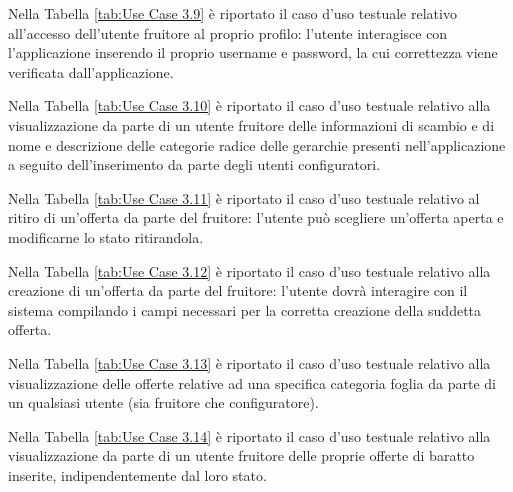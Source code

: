 Nella Tabella \ref{tab:Use Case 3.9} è riportato il caso d'uso testuale relativo all'accesso dell'utente fruitore al proprio profilo: l'utente interagisce con l'applicazione inserendo il proprio username e password, la cui correttezza viene verificata dall'applicazione.\bigskip

Nella Tabella \ref{tab:Use Case 3.10} è riportato il caso d'uso testuale relativo alla visualizzazione da parte di un utente fruitore delle informazioni di scambio e di nome e descrizione delle categorie radice delle gerarchie presenti nell'applicazione a seguito dell'inserimento da parte degli utenti configuratori.\bigskip

Nella Tabella \ref{tab:Use Case 3.11} è riportato il caso d'uso testuale relativo al ritiro di un'offerta da parte del fruitore: l'utente può scegliere un'offerta aperta e modificarne lo stato ritirandola.\bigskip

Nella Tabella \ref{tab:Use Case 3.12} è riportato il caso d'uso testuale relativo alla creazione di un'offerta da parte del fruitore: l'utente dovrà interagire con il sistema compilando i campi necessari per la corretta creazione della suddetta offerta.\bigskip

Nella Tabella \ref{tab:Use Case 3.13} è riportato il caso d'uso testuale relativo alla visualizzazione delle offerte relative ad una specifica categoria foglia da parte di un qualsiasi utente (sia fruitore che configuratore).\bigskip

Nella Tabella \ref{tab:Use Case 3.14} è riportato il caso d'uso testuale relativo alla visualizzazione da parte di un utente fruitore delle proprie offerte di baratto inserite, indipendentemente dal loro stato.\bigskip
